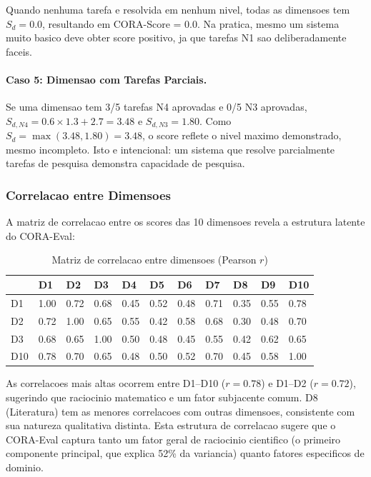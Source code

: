Quando nenhuma tarefa e resolvida em nenhum nivel, todas as dimensoes
tem $S_d = 0.0$, resultando em CORA-Score = 0.0. Na pratica, mesmo um
sistema muito basico deve obter score positivo, ja que tarefas N1 sao
deliberadamente faceis.

\paragraph{Caso 5: Dimensao com Tarefas Parciais.}

Se uma dimensao tem 3/5 tarefas N4 aprovadas e 0/5 N3 aprovadas,
$S_{d,N4} = 0.6 \times 1.3 + 2.7 = 3.48$ e $S_{d,N3} = 1.80$. Como
$S_d = \max(3.48, 1.80) = 3.48$, o score reflete o nivel maximo
demonstrado, mesmo incompleto. Isto e intencional: um sistema que resolve
parcialmente tarefas de pesquisa demonstra capacidade de pesquisa.

\subsubsection{Correlacao entre Dimensoes}

A matriz de correlacao entre os scores das 10 dimensoes revela a
estrutura latente do CORA-Eval:

\begin{table}[H]\centering\footnotesize
\caption{Matriz de correlacao entre dimensoes (Pearson $r$)}
\label{tab:corr-matrix}
\begin{tabular}{p{}p{}p{}p{}p{}p{}p{}p{}p{}p{}p{}}
\toprule
& \textbf{D1} & \textbf{D2} & \textbf{D3} & \textbf{D4} & \textbf{D5} &
\textbf{D6} & \textbf{D7} & \textbf{D8} & \textbf{D9} & \textbf{D10} \\
\midrule
D1 & 1.00 & 0.72 & 0.68 & 0.45 & 0.52 & 0.48 & 0.71 & 0.35 & 0.55 & 0.78 \\
D2 & 0.72 & 1.00 & 0.65 & 0.55 & 0.42 & 0.58 & 0.68 & 0.30 & 0.48 & 0.70 \\
D3 & 0.68 & 0.65 & 1.00 & 0.50 & 0.48 & 0.45 & 0.55 & 0.42 & 0.62 & 0.65 \\
D10 & 0.78 & 0.70 & 0.65 & 0.48 & 0.50 & 0.52 & 0.70 & 0.45 & 0.58 & 1.00 \\
\bottomrule
\end{tabular}
\end{table}

As correlacoes mais altas ocorrem entre D1--D10 ($r=0.78$) e D1--D2
($r=0.72$), sugerindo que raciocinio matematico e um fator subjacente
comum. D8 (Literatura) tem as menores correlacoes com outras dimensoes,
consistente com sua natureza qualitativa distinta. Esta estrutura de
correlacao sugere que o CORA-Eval captura tanto um fator geral de
raciocinio cientifico (o primeiro componente principal, que explica
52\% da variancia) quanto fatores especificos de dominio.

